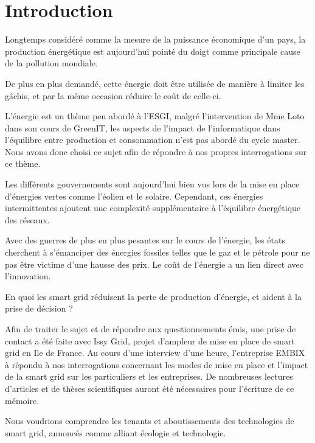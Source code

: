 \chapter*{Introduction}

Longtemps considéré comme la mesure de la puissance économique d'un pays,
la production énergétique est aujourd'hui pointé du doigt comme principale
cause de la pollution mondiale.

De plus en plus demandé, cette énergie doit être utilisée de manière à limiter les gâchis,
et par la même occasion réduire le coût de celle-ci.


L'énergie est un thème peu abordé à l'ESGI, malgré l'intervention de Mme Loto dans son cours de GreenIT, les
aspects de l'impact de l'informatique dans l'équilibre entre production et consommation n'est pas abordé
du cycle master. Nous avons donc choisi ce sujet afin de répondre à nos propres interrogations sur ce thème.

Les différents gouvernements sont aujourd'hui bien vus lors de la mise en place
d'énergies vertes comme l'éolien et le solaire. Cependant, ces énergies intermittentes ajoutent
une complexité supplémentaire à l'équilibre énergétique des réseaux.

Avec des guerres de plus en plus pesantes sur le cours de l'énergie, les états cherchent à s'émanciper
des énergies fossiles telles que le gaz et le pétrole pour ne pas être victime d'une hausse des prix.
Le coût de l'énergie a un lien direct avec l'innovation.


En quoi les smart grid réduisent la perte de production d'énergie, et aident à la
prise de décision ?

Afin de traiter le sujet et de répondre aux questionnements émis, une prise de contact a été faite
avec Issy Grid, projet d'ampleur de mise en place de smart grid en Ile de France.
Au cours d'une interview d'une heure, l'entreprise EMBIX à répondu à nos interrogations concernant les modes
de mise en place et l'impact de la smart grid sur les particuliers et les entreprises.
De nombreuses lectures d'articles et de thèses scientifiques auront été nécessaires
pour l'écriture de ce mémoire.

Nous voudrions comprendre les tenants et aboutissements des technologies de smart grid, annoncés comme
alliant écologie et technologie.

